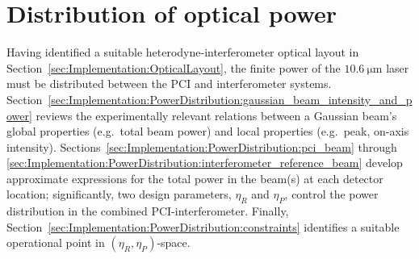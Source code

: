 \section{Distribution of optical power}
\label{sec:Implementation:PowerDistribution}
Having identified a suitable heterodyne-interferometer optical layout in
Section~\ref{sec:Implementation:OpticalLayout},
the finite power of the $\SI{10.6}{\micro\meter}$ laser
must be distributed between the PCI and interferometer systems.
Section~\ref{sec:Implementation:PowerDistribution:gaussian_beam_intensity_and_power}
reviews the experimentally relevant relations between a Gaussian beam's
global properties (e.g.\ total beam power) and
local properties (e.g.\ peak, on-axis intensity).
Sections~\ref{sec:Implementation:PowerDistribution:pci_beam} through
\ref{sec:Implementation:PowerDistribution:interferometer_reference_beam}
develop approximate expressions for the total power
in the beam(s) at each detector location;
significantly, two design parameters, $\eta_R$ and $\eta_P$,
control the power distribution in the combined PCI-interferometer.
Finally, Section~\ref{sec:Implementation:PowerDistribution:constraints}
identifies a suitable operational point in $(\eta_R, \eta_P)$-space.


